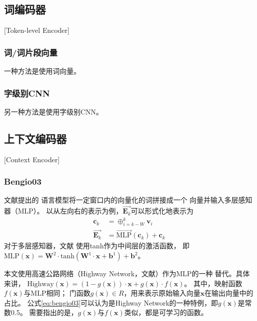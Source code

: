 \subsection{词编码器}[Token-level Encoder]

\subsubsection{词/词片段向量}

一种方法是使用词向量。

\subsubsection{字级别CNN}

另一种方法是使用字级别CNN。

\subsection{上下文编码器}[Context Encoder]

\subsubsection{Bengio03}

文献提出的
语言模型将一定窗口内的向量化的词拼接成一个
向量并输入多层感知器（MLP）。
以从左向右的表示为例，$\overrightarrow{\mathbf{E}_k}$可以形式化地表示为
\begin{align}
\mathbf{c}_k &= \oplus_{i=k-W}^k \mathbf{v}_i \\
\overrightarrow{\mathbf{E}_k} & = \overrightarrow{\text{MLP}}(\mathbf{c}_k) + \mathbf{c}_k \label{eq:bengio03}
\end{align}
对于多层感知器，文献
使用tanh作为中间层的激活函数，
即$\text{MLP}(\mathbf{x}) = \mathbf{W}^2 \cdot \text{tanh}(\mathbf{W}^1 \cdot \mathbf{x} + \mathbf{b}^1) + \mathbf{b}^2$。

本文使用高速公路网络（Highway Network，文献）作为MLP的一种
替代。具体来讲，
$
\text{Highway}(\mathbf{x}) = (1 - g(\mathbf{x}))\cdot \mathbf{x} + g(\mathbf{x})\cdot f(\mathbf{x})\text{。}
$
其中，映射函数$f(\mathbf{x})$与MLP相同；
门函数$g(\mathbf{x}) \in R$，用来表示原始输入向量$\mathbf{x}$在输出向量中的占比。
公式\ref{eq:bengio03}可以认为是Highway Network的一种特例，即$g(\mathbf{x})$是常数0.5。
需要指出的是，$g(\mathbf{x})$与$f(\mathbf{x})$类似，都是可学习的函数。

